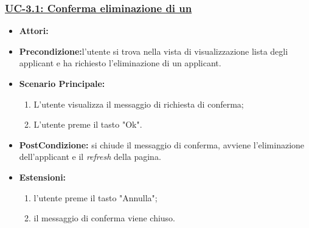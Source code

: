\subsubsection{\underline{UC-3.1: Conferma eliminazione di un\applicant}}
\begin{itemize}
	\item \textbf{Attori:}\loggedusr
	\item \textbf{Precondizione:}l'utente si trova nella vista di visualizzazione lista degli applicant e ha richiesto l'eliminazione di un applicant.
	\item \textbf{Scenario Principale:}
	\begin{enumerate}
		\item L'utente visualizza il messaggio di richiesta di conferma;
		\item L'utente preme il tasto "Ok".
	\end{enumerate}
	\item \textbf{PostCondizione:} si chiude il messaggio di conferma, avviene l'eliminazione dell'applicant e il \textit{refresh} della pagina.
	\item \textbf{Estensioni:} 
	\begin{enumerate}
		\item l'utente preme il tasto "Annulla";
		\item il messaggio di conferma viene chiuso.
	\end{enumerate}
\end{itemize}

